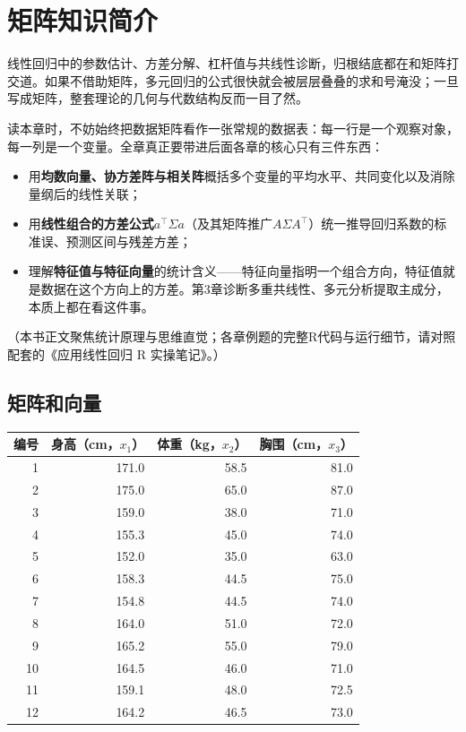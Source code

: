 \chapter{矩阵知识简介}
线性回归中的参数估计、方差分解、杠杆值与共线性诊断，归根结底都在和矩阵打交道。如果不借助矩阵，多元回归的公式很快就会被层层叠叠的求和号淹没；一旦写成矩阵，整套理论的几何与代数结构反而一目了然。

读本章时，不妨始终把数据矩阵看作一张常规的数据表：每一行是一个观察对象，每一列是一个变量。全章真正要带进后面各章的核心只有三件东西：
\begin{itemize}
\item 用\textbf{均数向量、协方差阵与相关阵}概括多个变量的平均水平、共同变化以及消除量纲后的线性关联；
\item 用\textbf{线性组合的方差公式}$a^\top\Sigma a$（及其矩阵推广$A\Sigma A^\top$）统一推导回归系数的标准误、预测区间与残差方差；
\item 理解\textbf{特征值与特征向量}的统计含义——特征向量指明一个组合方向，特征值就是数据在这个方向上的方差。第3章诊断多重共线性、多元分析提取主成分，本质上都在看这件事。
\end{itemize}
（本书正文聚焦统计原理与思维直觉；各章例题的完整R代码与运行细节，请对照配套的《应用线性回归 R 实操笔记》。）

\section{矩阵和向量}
\par\noindent\begin{minipage}{\linewidth}
\begin{center}\small
\begin{tabular}{rrrr}
\toprule 编号 & 身高（cm，$x_1$） & 体重（kg，$x_2$） & 胸围（cm，$x_3$）\\\midrule
1&171.0&58.5&81.0\\2&175.0&65.0&87.0\\3&159.0&38.0&71.0\\
4&155.3&45.0&74.0\\5&152.0&35.0&63.0\\6&158.3&44.5&75.0\\
7&154.8&44.5&74.0\\8&164.0&51.0&72.0\\9&165.2&55.0&79.0\\
10&164.5&46.0&71.0\\11&159.1&48.0&72.5\\12&164.2&46.5&73.0\\\bottomrule
\end{tabular}\end{center}
\end{minipage}\par\medskip

